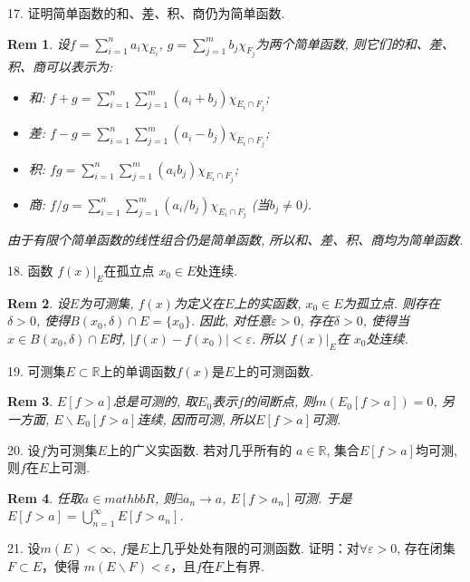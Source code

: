 \documentclass[UTF8]{article}
\newtheorem*{remark}{Rem}
\begin{document}
    17. 证明简单函数的和、差、积、商仍为简单函数.\par
    \begin{remark}
        设$f=\sum_{i=1}^{n}a_i\chi_{E_i}$, $g=\sum_{j=1}^{m}b_j\chi_{F_j}$为两个简单函数, 则它们的和、差、积、商可以表示为:
        \begin{itemize}
            \item 和: $f+g=\sum_{i=1}^{n}\sum_{j=1}^{m}(a_i+b_j)\chi_{E_i\cap F_j}$;
            \item 差: $f-g=\sum_{i=1}^{n}\sum_{j=1}^{m}(a_i-b_j)\chi_{E_i\cap F_j}$;
            \item 积: $fg=\sum_{i=1}^{n}\sum_{j=1}^{m}(a_ib_j)\chi_{E_i\cap F_j}$;
            \item 商: $f/g=\sum_{i=1}^{n}\sum_{j=1}^{m}(a_i/b_j)\chi_{E_i\cap F_j}$ (当$b_j\neq 0$).
        \end{itemize}
        由于有限个简单函数的线性组合仍是简单函数, 所以和、差、积、商均为简单函数.\par
    \end{remark}
    18. 函数 $\left.f(x)\right|_{E}$在孤立点 $x_0\in E$处连续.\par
    \begin{remark}
        设$E$为可测集, $f(x)$为定义在$E$上的实函数, $x_0\in E$为孤立点. 则存在$\delta>0$, 使得$B(x_0,\delta)\cap E=\{x_0\}$. 因此, 对任意$\varepsilon>0$, 存在$\delta>0$, 使得当$x\in B(x_0,\delta)\cap E$时, $|f(x)-f(x_0)|<\varepsilon$. 所以 $\left.f(x)\right|_{E}$在 $x_0$处连续.\par
    \end{remark}
    19. 可测集$E\subset \mathbb{R}$上的单调函数$f(x)$是$E$上的可测函数.\par
    \begin{remark}
        $E\left[f>a\right]$总是可测的, 取$E_0$表示$f$的间断点, 则$m\left(E_0\left[f>a\right]\right)=0$, 另一方面, $E\backslash E_0\left[f>a\right]$连续, 因而可测, 所以$E\left[f>a\right]$可测.\par
    \end{remark}
    20. 设$f$为可测集$E$上的广义实函数. 若对几乎所有的 $a\in \mathbb{R}$, 集合$E\left[f>a\right]$均可测, 则$f$在$E$上可测.\par
    \begin{remark}
        任取$a\in mathbb{R}$, 则$\exists a_n \rightarrow a$, $E\left[f>a_n\right]$可测. 于是$E\left[f>a\right] = \bigcup_{n=1}^{\infty}E\left[f>a_n\right]$.\par
    \end{remark}
    21. 设$m(E)<\infty$, $f$是$E$上几乎处处有限的可测函数. 证明：对$\forall \varepsilon >0$, 存在闭集$F\subset E$，使得 $m(E\backslash F)<\varepsilon$，且$f$在$F$上有界.\par
\end{document}
